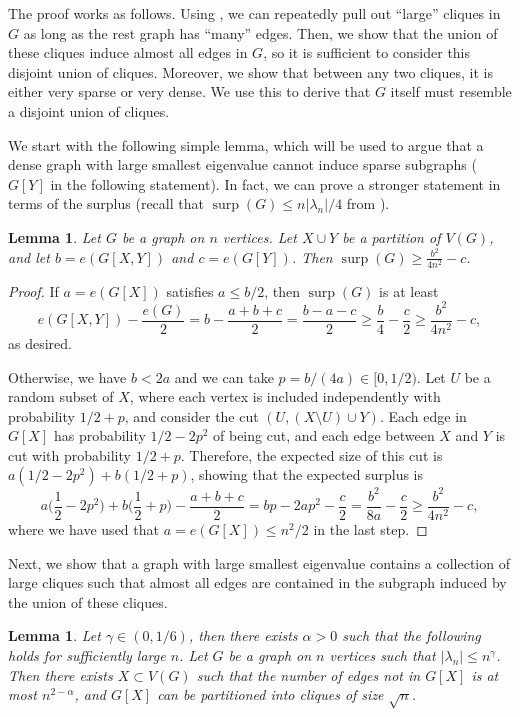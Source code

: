 \documentclass[11pt]{article}
\theoremstyle{plain}
\newtheorem{lemma}[theorem]{Lemma}
\theoremstyle{definition}
\DeclareMathOperator{\surp}{surp}
\begin{document}
The proof works as follows. 
Using , we can repeatedly pull out ``large'' cliques in $G$ as long as the rest graph has ``many'' edges.
Then, we show that the union of these cliques induce almost all edges in $G$, so it is sufficient to consider this disjoint union of cliques.
Moreover, we show that between any two cliques, it is either very sparse or very dense.
We use this to derive that $G$ itself must resemble a disjoint union of cliques.

We start with the following simple lemma, which will be used to argue that a dense graph with large smallest eigenvalue cannot induce sparse subgraphs ($G[Y]$ in the following statement).
In fact, we can prove a stronger statement in terms of the surplus (recall that $\surp(G) \le n|\lambda_n|/4$ from ).

\begin{lemma}\label{lemma:inbalanced_partition}
Let $G$ be a graph on $n$ vertices. Let $X\cup Y$ be a partition of $V(G)$, and let $b=e(G[X,Y])$ and $c=e(G[Y])$. Then $\surp(G)\geq \frac{b^2}{4n^2}-c$.
\end{lemma}

\begin{proof}
If $a=e(G[X])$ satisfies $a\leq b/2$, then $\surp(G)$ is at least $$e(G[X,Y])-\frac{e(G)}{2}=b-\frac{a+b+c}{2}= \frac{b-a-c}{2} \ge \frac{b}{4}-\frac{c}{2}\ge \frac{b^2}{4n^2}-c,$$ as desired.

Otherwise, we have $b < 2a$ and we can take $p=b/(4a) \in [0,1/2)$. 
Let $U$ be a random subset of $X$, where each vertex is included independently with probability $1/2+p$, and consider the cut $(U, (X\setminus U)\cup Y)$. Each edge in $G[X]$ has probability $1/2-2p^2$ of being cut, and each edge between $X$ and $Y$ is cut with probability $1/2+p$. Therefore, the expected size of this cut is $a(1/2-2p^2)+b(1/2+p)$, showing that the expected surplus is 
\[a\Big(\frac{1}{2}-2p^2\Big)+b\Big(\frac{1}{2}+p\Big)-\frac{a+b+c}{2}=bp-2ap^2-\frac{c}{2}=\frac{b^2}{8a}-\frac{c}{2} \ge \frac{b^2}{4n^2}-c,\]
where we have used that $a=e(G[X])\leq n^2/2$ in the last step.
\end{proof}

Next, we show that a graph with large smallest eigenvalue contains a collection of large cliques such that almost all edges are contained in the subgraph induced by the union of these cliques.

\begin{lemma}\label{lemma:many_cliques}
Let $\gamma\in (0,1/6)$, then there exists $\alpha>0$ such that the following holds for sufficiently large $n$. Let $G$ be a graph on $n$ vertices such that $|\lambda_n|\leq n^{\gamma}$. Then there exists $X\subset V(G)$ such that the number of edges not in $G[X]$ is at most $n^{2-\alpha}$, and $G[X]$ can be partitioned into cliques of size $\sqrt{n}$. 
\end{lemma}
\end{document}
